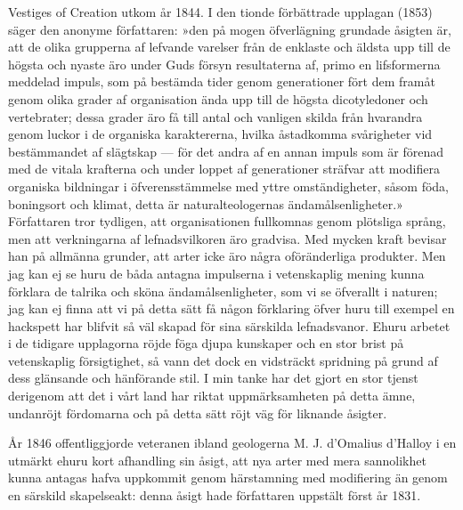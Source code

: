 Vestiges of Creation utkom år 1844. I den tionde förbättrade upplagan (1853) säger den anonyme författaren: »den på mogen öfverlägning grundade åsigten är, att de olika grupperna af lefvande varelser från de enklaste och äldsta upp till de högsta och nyaste äro under Guds försyn resultaterna af, primo en lifsformerna meddelad impuls, som på bestämda tider genom generationer fört dem framåt genom olika grader af organisation ända upp till de högsta dicotyledoner och vertebrater; dessa grader äro få till antal och vanligen skilda från hvarandra genom luckor i de organiska karaktererna, hvilka åstadkomma svårigheter vid bestämmandet af slägtskap — för det andra af en annan impuls som är förenad med de vitala krafterna och under loppet af generationer sträfvar att modifiera organiska bildningar i öfverensstämmelse med yttre omständigheter, såsom föda, boningsort och klimat, detta är naturalteologernas ändamålsenligheter.» Författaren tror tydligen, att organisationen fullkomnas genom plötsliga språng, men att verkningarna af lefnadsvilkoren äro gradvisa. Med mycken kraft bevisar han på allmänna grunder, att arter icke äro några oföränderliga produkter. Men jag kan ej se huru de båda antagna impulserna i vetenskaplig mening kunna förklara de talrika och sköna ändamålsenligheter, som vi se öfverallt i naturen; jag kan ej finna att vi på detta sätt få någon förklaring öfver huru till exempel en hackspett har blifvit så väl skapad för sina särskilda lefnadsvanor. Ehuru arbetet i de tidigare upplagorna röjde föga djupa kunskaper och en stor brist på vetenskaplig försigtighet, så vann det dock en vidsträckt spridning på grund af dess glänsande och hänförande stil. I min tanke har det gjort en stor tjenst derigenom att det i vårt land har riktat uppmärksamheten på detta ämne, undanröjt fördomarna och på detta sätt röjt väg för liknande åsigter.

År 1846 offentliggjorde veteranen ibland geologerna M. J. \linebreak d’Omalius d’Halloy i en utmärkt ehuru kort afhandling sin åsigt, att nya arter med mera sannolikhet kunna antagas hafva uppkommit genom härstamning med modifiering än genom en särskild skapelseakt: denna åsigt hade författaren uppstält först år 1831.

